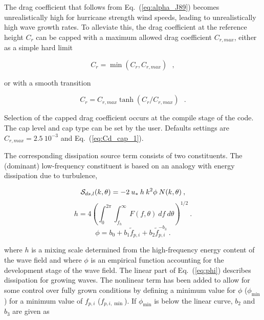 The drag coefficient that follows from Eq.~(\ref{eq:alpha_J89}) becomes
unrealistically high for hurricane strength wind speeds, leading to
unrealistically high wave growth rates. To alleviate this, the drag
coefficient at the reference height $C_r$ can be capped with a maximum allowed
drag coefficient $C_{r,max}$, either as a simple hard limit

\begin{equation}
C_r = \min ( C_r , C_{r,max}) \:\:\: , \label{eq:Cd_cap_1}
\end{equation}

\noindent
or with a smooth transition

\begin{equation}
C_r = C_{r,max} \tanh ( C_r / C_{r,max} ) \:\:\: . \label{eq:Cd_cap_2}
\end{equation}

\noindent
Selection of the capped drag coefficient occurs at the compile stage of the
code. The cap level and cap type can be set by the user. Defaults settings are
$C_{r,max} = 2.5 \:10^{-3}$ and Eq.~(\ref{eq:Cd_cap_1}).



The corresponding dissipation source term consists of two constituents.  The
(dominant) low-frequency constituent is based on an analogy with energy
dissipation due to turbulence,


\begin{equation}
\cS_{ds,l}(k,\theta) = -2 \: u_{\ast} \: h \: k^2 \phi
\: N(k,\theta) \: , \label{eq:TCdl}
\end{equation} \begin{equation}
h = 4\left(\int_{0}^{2\pi} \int_{f_h}^{\infty} \: F(f,\theta) \:
d f \: d\theta \right)^{1/2} \: . \label{eq:h} \end{equation} \begin{equation}
\phi = b_0 + b_1 \tilde{f}_{p,i}  + b_2 \tilde{f}_{p,i} ^{- b_3}
\: . \label{eq:phi} \end{equation}

\noindent
where $h$ is a mixing scale determined from the high-frequency energy content
of the wave field and where $\phi$ is an empirical function accounting for the
development stage of the wave field. The linear part of Eq.~(\ref{eq:phi})
describes dissipation for growing waves. The nonlinear term has been added to
allow for some control over fully grown conditions by defining a minimum value
for $\phi$ ($\phi_{\min}$) for a minimum value of $f_{p,i}$
($f_{p,i,\min}$). If $\phi_{\min}$ is below the linear curve, $b_2$ and $b_3$
are given as

